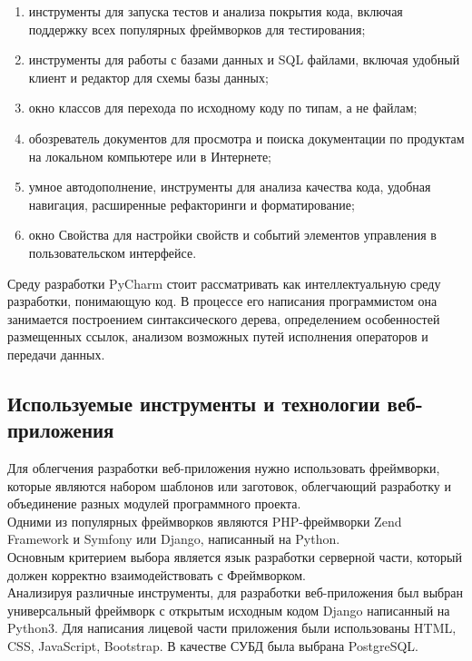 \documentclass[a4paper, 10pt]{article}
\begin{document}
	\begin{enumerate}
		\item инструменты для запуска тестов и анализа покрытия кода, включая поддержку всех популярных фреймворков для тестирования;
		\item инструменты для работы с базами данных и SQL файлами, включая удобный клиент и редактор для схемы базы данных;
		\item окно классов для перехода по исходному коду по типам, а не файлам;
		\item обозреватель документов для просмотра и поиска документации по продуктам на локальном компьютере или в Интернете;
		\item умное автодополнение, инструменты для анализа качества кода, удобная навигация, расширенные рефакторинги и форматирование;
		\item окно Свойства для настройки свойств и событий элементов управления в пользовательском интерфейсе.
	\end{enumerate}
	\hspace*{5mm} Среду разработки PyCharm стоит рассматривать как интеллектуальную среду разработки, понимающую код. В процессе его написания программистом она занимается построением синтаксического дерева, определением особенностей размещенных ссылок, анализом возможных путей исполнения операторов и передачи данных.
	\subsection{Используемые инструменты и технологии веб-приложения}
	\hspace*{5mm}Для облегчения разработки веб-приложения нужно использовать фреймворки, которые являются набором шаблонов или заготовок, облегчающий разработку и объединение разных модулей программного проекта. 
	\\ \hspace*{5mm} Одними из популярных фреймворков являются PHP-фреймворки Zend Framework и Symfony или Django\cite{djangoproject}, написанный на Python. 
	\\ \hspace*{5mm} Основным критерием выбора является язык разработки серверной части, который должен корректно взаимодействовать с Фреймворком.  
	\\ \hspace*{5mm} Анализируя различные инструменты, для разработки веб-приложения был выбран универсальный фреймворк с открытым исходным кодом Django написанный на Python3\cite{python}. Для написания лицевой части приложения были использованы HTML\cite{html}, CSS\cite{css}, JavaScript, Bootstrap\cite{bootstrap}. В качестве СУБД была выбрана PostgreSQL\cite{postgres}.
\end{document}
